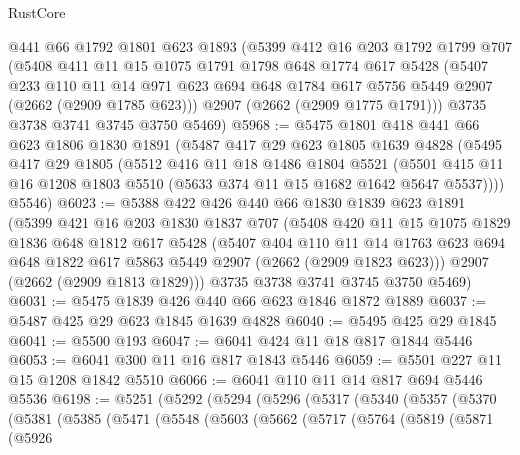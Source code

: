 \begin{lexlean}{RustCore}
\begin{coremodule}
    @441
    @66
    @1792
    @1801
    @623
    @1893
    (@5399
      @412
      @16
      @203
      @1792
      @1799
      @707
      (@5408
        @411
        @11
        @15
        @1075
        @1791
        @1798
        @648
        @1774
        @617
        @5428
        (@5407
          @233
          @110
          @11
          @14
          @971
          @623
          @694
          @648
          @1784
          @617
          @5756
          @5449
          @2907
          (@2662 (@2909 @1785 @623)))
        @2907
        (@2662 (@2909 @1775 @1791)))
      @3735
      @3738
      @3741
      @3745
      @3750
      @5469)
@5968 := @5475
    @1801
    @418
    @441
    @66
    @623
    @1806
    @1830
    @1891
    (@5487
      @417
      @29
      @623
      @1805
      @1639
      @4828
      (@5495
        @417
        @29
        @1805
        (@5512
          @416
          @11
          @18
          @1486
          @1804
          @5521
          (@5501 @415 @11 @16 @1208 @1803 @5510 (@5633 @374 @11 @15 @1682 @1642 @5647 @5537))))
      @5546)
@6023 := @5388
    @422
    @426
    @440
    @66
    @1830
    @1839
    @623
    @1891
    (@5399
      @421
      @16
      @203
      @1830
      @1837
      @707
      (@5408
        @420
        @11
        @15
        @1075
        @1829
        @1836
        @648
        @1812
        @617
        @5428
        (@5407
          @404
          @110
          @11
          @14
          @1763
          @623
          @694
          @648
          @1822
          @617
          @5863
          @5449
          @2907
          (@2662 (@2909 @1823 @623)))
        @2907
        (@2662 (@2909 @1813 @1829)))
      @3735
      @3738
      @3741
      @3745
      @3750
      @5469)
@6031 := @5475 @1839 @426 @440 @66 @623 @1846 @1872 @1889
@6037 := @5487 @425 @29 @623 @1845 @1639 @4828
@6040 := @5495 @425 @29 @1845
@6041 := @5500 @193
@6047 := @6041 @424 @11 @18 @817 @1844 @5446
@6053 := @6041 @300 @11 @16 @817 @1843 @5446
@6059 := @5501 @227 @11 @15 @1208 @1842 @5510
@6066 := @6041 @110 @11 @14 @817 @694 @5446 @5536
@6198 := @5251
    (@5292
      (@5294
        (@5296
          (@5317
            (@5340
              (@5357
                (@5370
                  (@5381
                    (@5385
                      (@5471
                        (@5548
                          (@5603
                            (@5662
                              (@5717
                                (@5764
                                  (@5819
                                    (@5871
                                      (@5926

\end{coremodule}
\end{lexlean}
